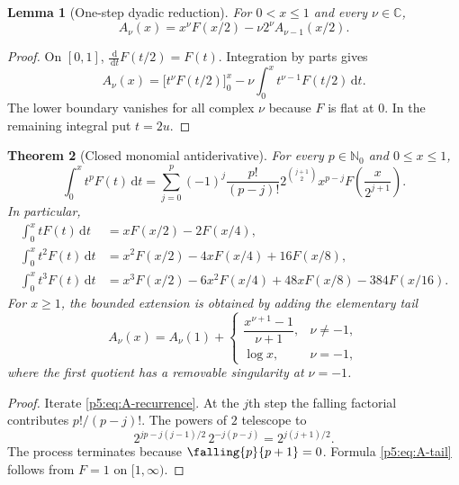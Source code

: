 \documentclass[11pt,oneside]{article}
\newtheorem{theorem}{Theorem}[section]
\newtheorem{lemma}[theorem]{Lemma}
\theoremstyle{definition}
\theoremstyle{remark}
\newcommand{\C}{\mathbb C}
\newcommand{\N}{\mathbb N}
\newcommand{\dd}{\,\mathrm d}
\newcommand{\1}{\mathbf 1}
\begin{document}
\begin{lemma}[One-step dyadic reduction]\label{p5:lem:A-recurrence}
For $0<x\le1$ and every $\nu\in\C$,
\begin{equation}\label{p5:eq:A-recurrence}
 A_\nu(x)=x^\nu F(x/2)-\nu 2^\nu A_{\nu-1}(x/2).
\end{equation}
\end{lemma}

\begin{proof}
On $[0,1]$, $\frac{\dd}{\dd t}F(t/2)=F(t)$.  Integration by parts gives
\[
 A_\nu(x)=\bigl[t^\nu F(t/2)\bigr]_{0}^{x}
 -\nu\int_0^x t^{\nu-1}F(t/2)\dd t.
\]
The lower boundary vanishes for all complex $\nu$ because $F$ is flat at $0$.  In the remaining integral put $t=2u$.
\end{proof}

\begin{theorem}[Closed monomial antiderivative]\label{p5:thm:integer-weight-antiderivative}
For every $p\in\N_0$ and $0\le x\le1$,
\begin{equation}\label{p5:eq:integer-weight-antiderivative}
\boxed{
 \int_0^x t^pF(t)\dd t
 =\sum_{j=0}^{p}(-1)^j\frac{p!}{(p-j)!}
 2^{\binom{j+1}{2}}x^{p-j}
 F\!\left(\frac{x}{2^{j+1}}\right).}
\end{equation}
In particular,
\begin{align}
\int_0^x tF(t)\dd t
 &=xF(x/2)-2F(x/4),\label{p5:eq:A1}\\
\int_0^x t^2F(t)\dd t
 &=x^2F(x/2)-4xF(x/4)+16F(x/8),\label{p5:eq:A2}\\
\int_0^x t^3F(t)\dd t
 &=x^3F(x/2)-6x^2F(x/4)+48xF(x/8)-384F(x/16).
\end{align}
For $x\ge1$, the bounded extension is obtained by adding the elementary tail
\begin{equation}\label{p5:eq:A-tail}
 A_\nu(x)=A_\nu(1)+
 \begin{cases}
 \dfrac{x^{\nu+1}-1}{\nu+1},&\nu\ne-1,\\[0.7em]
 \log x,&\nu=-1,
 \end{cases}
\end{equation}
where the first quotient has a removable singularity at $\nu=-1$.
\end{theorem}

\begin{proof}
Iterate \eqref{p5:eq:A-recurrence}.  At the $j$th step the falling factorial contributes $p!/(p-j)!$.  The powers of $2$ telescope to
\[
 2^{jp-j(j-1)/2}\,2^{-j(p-j)}=2^{j(j+1)/2}.
\]
The process terminates because $\falling{p}{p+1}=0$.  Formula \eqref{p5:eq:A-tail} follows from $F=1$ on $[1,\infty)$.
\end{proof}
\end{document}

